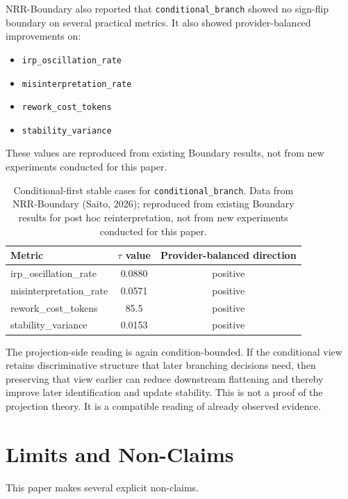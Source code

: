 \documentclass[11pt,a4paper]{article}
\begin{document}
NRR-Boundary also reported that \texttt{conditional\_branch} showed no sign-flip boundary on several practical metrics. It also showed provider-balanced improvements on:
\begin{itemize}
  \item \texttt{irp\_oscillation\_rate}
  \item \texttt{misinterpretation\_rate}
  \item \texttt{rework\_cost\_tokens}
  \item \texttt{stability\_variance}
\end{itemize}

These values are reproduced from existing Boundary results, not from new experiments conducted for this paper.

\begin{table}[h]
\centering
\small
\begin{tabular}{p{4.3cm}cc}
\toprule
Metric & $\tau$ value & Provider-balanced direction \\
\midrule
irp\_oscillation\_rate & 0.0880 & positive \\
misinterpretation\_rate & 0.0571 & positive \\
rework\_cost\_tokens & 85.5 & positive \\
stability\_variance & 0.0153 & positive \\
\bottomrule
\end{tabular}
\caption{Conditional-first stable cases for \texttt{conditional\_branch}. Data from NRR-Boundary (Saito, 2026); reproduced from existing Boundary results for post hoc reinterpretation, not from new experiments conducted for this paper.}
\label{tab:boundary_conditional_first}
\end{table}

The projection-side reading is again condition-bounded. If the conditional view retains discriminative structure that later branching decisions need, then preserving that view earlier can reduce downstream flattening and thereby improve later identification and update stability. This is not a proof of the projection theory. It is a compatible reading of already observed evidence.

\section{Limits and Non-Claims}
\label{sec:limits}

This paper makes several explicit non-claims.
\end{document}
